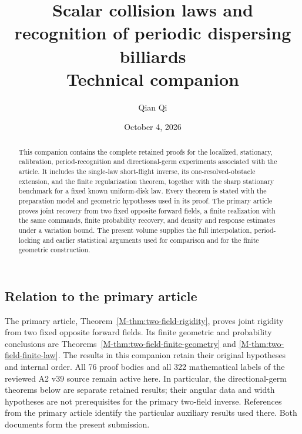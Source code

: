 \documentclass[11pt]{amsart}
\title[Scalar collision laws: companion]{Scalar collision laws and recognition of periodic dispersing billiards\\ Technical companion}
\author{Qian Qi}
\date{October 4, 2026}
\begin{document}
\raggedbottom
\begin{abstract}
This companion contains the complete retained proofs for the localized,
stationary, calibration, period-recognition and directional-germ
experiments associated with the article. It includes the single-law
short-flight inverse, its one-resolved-obstacle extension, and the
finite regularization theorem, together with the sharp stationary
benchmark for a fixed known uniform-disk law. Every theorem is stated
with the preparation model and geometric hypotheses used in its proof.
The primary article proves joint recovery from two fixed opposite
forward fields, a finite realization with the same commands, finite
probability recovery, and density and response estimates under a
variation bound. The present volume supplies the full interpolation,
period-locking and earlier statistical arguments used for comparison
and for the finite geometric construction.
\end{abstract}
\maketitle
\subsection*{Relation to the primary article}
The primary article, Theorem~\ref{M-thm:two-field-rigidity}, proves
joint rigidity from two fixed opposite forward fields. Its finite
geometric and probability conclusions are
Theorems~\ref{M-thm:two-field-finite-geometry} and
\ref{M-thm:two-field-finite-law}. The results in this companion retain
their original hypotheses and internal order. All 76 proof bodies and
all 322 mathematical labels of the reviewed A2 v39 source remain
active here. In particular, the directional-germ theorems below are
separate retained results; their angular data and width hypotheses
are not prerequisites for the primary two-field inverse. References
from the primary article identify the particular auxiliary results
used there. Both documents form the present submission.







\appendix

















\end{document}
